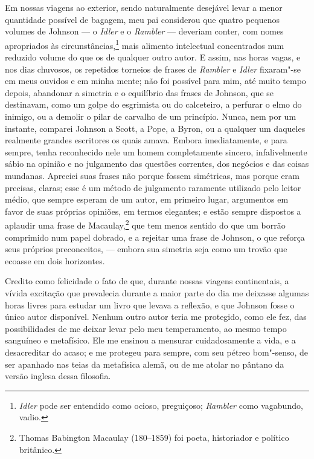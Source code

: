 Em nossas viagens ao exterior, sendo naturalmente desejável levar a
menor quantidade possível de bagagem, meu pai considerou que quatro
pequenos volumes de Johnson --- o \textit{Idler} e o \textit{Rambler} ---
deveriam conter, com nomes apropriados às circunstâncias,\footnote{\textit{Idler}
  pode ser entendido como ocioso, preguiçoso; \textit{Rambler} como vagabundo, vadio.} mais alimento intelectual concentrados num reduzido volume do
que os de qualquer outro autor. E assim, nas horas vagas, e nos dias
chuvosos, os repetidos torneios de frases de \textit{Rambler} e
\textit{Idler} fixaram"-se em meus ouvidos e em minha mente; não foi
possível para mim, até muito tempo depois, abandonar a simetria e o
equilíbrio das frases de Johnson, que se destinavam, como um golpe do
esgrimista ou do calceteiro, a perfurar o elmo do inimigo, ou a demolir
o pilar de carvalho de um princípio. Nunca, nem por um instante,
comparei Johnson a Scott, a Pope, a Byron, ou a qualquer um daqueles
realmente grandes escritores os quais amava. Embora imediatamente, e
para sempre, tenha reconhecido nele um homem completamente sincero,
infalivelmente sábio na opinião e no julgamento das questões correntes,
dos negócios e das coisas mundanas. Apreciei suas frases não porque
fossem simétricas, mas porque eram precisas, claras; esse é um método de
julgamento raramente utilizado pelo leitor médio, que sempre esperam de
um autor, em primeiro lugar, argumentos em favor de suas próprias
opiniões, em termos elegantes; e estão sempre dispostos a aplaudir uma
frase de Macaulay,\footnote{Thomas Babington Macaulay (180--1859) foi poeta,
  historiador e político britânico.} que tem menos
sentido do que um borrão comprimido num papel dobrado, e a rejeitar uma
frase de Johnson, o que reforça seus próprios preconceitos, --- embora
sua simetria seja como um trovão que ecoasse em dois horizontes.

Credito como felicidade o fato de que, durante nossas viagens
continentais, a vívida excitação que prevalecia durante a maior parte do
dia me deixasse algumas horas livres para estudar um livro que levava a
reflexão, e que Johnson fosse o único autor disponível. Nenhum outro
autor teria me protegido, como ele fez, das possibilidades de me deixar
levar pelo meu temperamento, ao mesmo tempo sanguíneo e metafísico. Ele
me ensinou a mensurar cuidadosamente a vida, e a desacreditar do acaso;
e me protegeu para sempre, com seu pétreo bom"-senso, de ser apanhado nas
teias da metafísica alemã, ou de me atolar no pântano da versão inglesa
dessa filosofia.

